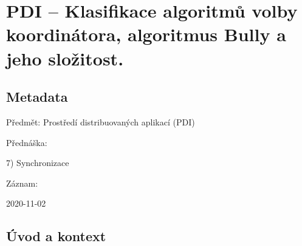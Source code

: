 

\graphicspath{{pdi/volba_koordinatora}}


\chapter{PDI -- Klasifikace algoritmů volby koordinátora, algoritmus Bully a jeho složitost.}


\section{Metadata}

\begin{compactitem}
    \item Předmět: Prostředí distribuovaných aplikací (PDI)
    \item Přednáška:
    \begin{compactitem}
        \item 7) Synchronizace
    \end{compactitem}
    \item Záznam:
    \begin{compactitem}
        \item 2020-11-02
    \end{compactitem}
\end{compactitem}


\section{Úvod a kontext}

